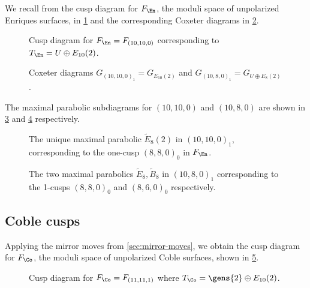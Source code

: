 \documentclass[../main.tex]{subfiles}
\begin{document}
We recall from \cite{AEGS23} the cusp diagram for $F_\En$, the moduli space of unpolarized Enriques surfaces, in \cref{fig:enriques-cusps} and the corresponding Coxeter diagrams in \cref{fig:enriques-coxeter-diagrams}.

\begin{figure}[H]
    \centering
    
    \caption{Cusp diagram for $F_\En = F_{(10, 10, 0)}$ corresponding to $T_\En = U \oplus E_{10}(2)$.}
    \label{fig:enriques-cusps}
\end{figure}

\begin{figure}[H]
  \centering
  
  \caption{Coxeter diagrams $G_{(10,10,0)_1} = G_{E_{10}(2)}$ and $G_{(10,8,0)_1} = G_{U \oplus E_8(2)}$.}
  \label{fig:enriques-coxeter-diagrams}
\end{figure}

The maximal parabolic subdiagrams for $(10, 10, 0)$ and $(10, 8, 0)$ are shown in \cref{fig:enriques-maximal-parabolics-10-10-0} and \cref{fig:enriques-maximal-parabolics-10-8-0} respectively.

\begin{figure}[H]
    \centering

    \caption{The unique maximal parabolic $\tilde E_8(2)$ in $(10, 10, 0)_1$, corresponding to the one-cusp $(8, 8, 0)_0$ in $F_\En$.}
    \label{fig:enriques-maximal-parabolics-10-10-0}
\end{figure}



\begin{figure}[H]
    \centering
    
    \caption{The two maximal parabolics $\tilde E_8, \tilde B_8$ in $(10, 8, 0)_1$ corresponding to the 1-cusps $(8,8,0)_0$ and $(8,6,0)_0$ respectively.}
    \label{fig:enriques-maximal-parabolics-10-8-0}
\end{figure}

\subsection{Coble cusps}

Applying the mirror moves from \cref{sec:mirror-moves}, we obtain the cusp diagram for $F_\Co$, the moduli space of unpolarized Coble surfaces, shown in \cref{fig:coble-cusps}.

\begin{figure}[H]
    \centering
    
    \caption{Cusp diagram for $F_\Co = F_{(11, 11, 1)}$ where $T_\Co = \gens{2} \oplus E_{10}(2)$.}
    \label{fig:coble-cusps}
\end{figure}
\end{document}
